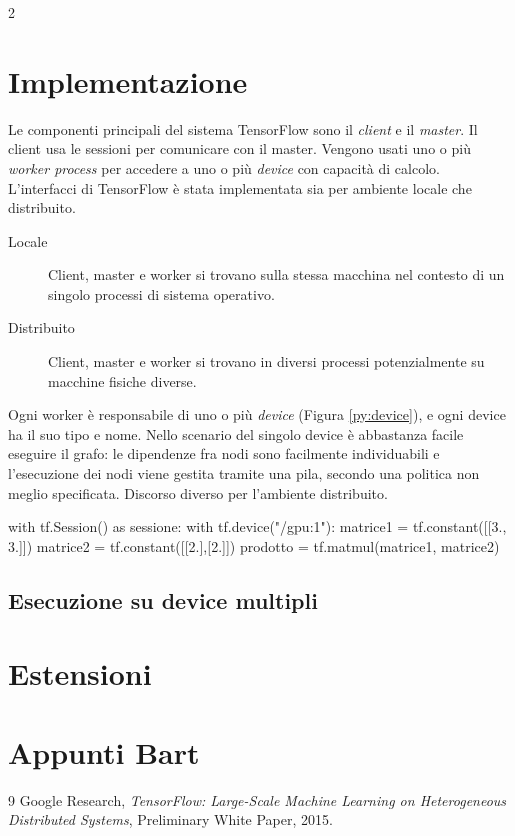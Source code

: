 \documentclass[DIV=calc, paper=a4, fontsize=11pt]{scrartcl}	 %
\begin{document}
\begin{multicols}{2}
		\section{Implementazione}
			Le componenti principali del sistema TensorFlow sono il \textit{client} e il \textit{master}. Il client usa le sessioni per comunicare con il master. Vengono usati uno o più \textit{worker process} per accedere a uno o più \textit{device} con capacità di calcolo. L'interfacci di TensorFlow è stata implementata sia per ambiente locale che distribuito.
			\begin{description}
				\item[Locale] Client, master e worker si trovano sulla stessa macchina nel contesto di un singolo processi di sistema operativo.
				\item[Distribuito] Client, master e worker si trovano in diversi processi potenzialmente su macchine fisiche diverse.
			\end{description}
			Ogni worker è responsabile di uno o più \textit{device} (Figura \ref{py:device}), e ogni device ha il suo tipo e nome. Nello scenario del singolo device è abbastanza facile eseguire il grafo: le dipendenze fra nodi sono facilmente individuabili e l'esecuzione dei nodi viene gestita tramite una pila, secondo una politica non meglio specificata. Discorso diverso per l'ambiente distribuito.
			\begin{figure*}
				\centering
				\begin{python}
with tf.Session() as sessione:
	with tf.device("/gpu:1"):
		matrice1 = tf.constant([[3., 3.]])
		matrice2 = tf.constant([[2.],[2.]])
		prodotto = tf.matmul(matrice1, matrice2)
				\end{python}
				\caption{Vincolo di esecuzione tramite la \texttt{GPU 1} presente nel sistema}
				\label{py:device}
			\end{figure*}
			\subsection{Esecuzione su device multipli}
			
		\section{Estensioni}
		
		\section{Appunti Bart}		
		
		\begin{thebibliography}{9}
			Google Research,
			\emph{TensorFlow: Large-Scale Machine Learning on Heterogeneous Distributed Systems},
			Preliminary White Paper,
			2015.
		\end{thebibliography}
	\end{multicols}
\end{document}
